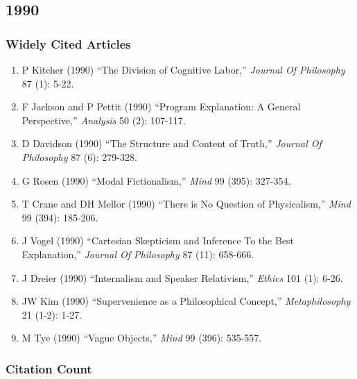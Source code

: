 \documentclass[
  10pt,
  letterpaper,
  DIV=11,
  numbers=noendperiod,
  twoside]{scrartcl}
\providecommand{\tightlist}{%
  \setlength{\itemsep}{0pt}\setlength{\parskip}{0pt}}\usepackage{longtable,booktabs,array}
\begin{document}
\newpage

\subsection{1990}\label{sec-s1990}

\subsubsection*{Widely Cited Articles}\label{widely-cited-articles-34}

\begin{enumerate}
\def\labelenumi{\arabic{enumi}.}
\tightlist
\item
  P Kitcher (1990) ``The Division of Cognitive Labor,'' \emph{Journal Of
  Philosophy} 87 (1): 5-22.
\item
  F Jackson and P Pettit (1990) ``Program Explanation: A General
  Perspective,'' \emph{Analysis} 50 (2): 107-117.
\item
  D Davidson (1990) ``The Structure and Content of Truth,''
  \emph{Journal Of Philosophy} 87 (6): 279-328.
\item
  G Rosen (1990) ``Modal Fictionalism,'' \emph{Mind} 99 (395): 327-354.
\item
  T Crane and DH Mellor (1990) ``There is No Question of Physicalism,''
  \emph{Mind} 99 (394): 185-206.
\item
  J Vogel (1990) ``Cartesian Skepticism and Inference To the Best
  Explanation,'' \emph{Journal Of Philosophy} 87 (11): 658-666.
\item
  J Dreier (1990) ``Internalism and Speaker Relativism,'' \emph{Ethics}
  101 (1): 6-26.
\item
  JW Kim (1990) ``Supervenience as a Philosophical Concept,''
  \emph{Metaphilosophy} 21 (1-2): 1-27.
\item
  M Tye (1990) ``Vague Objects,'' \emph{Mind} 99 (396): 535-557.
\end{enumerate}

\subsubsection*{Citation Count}\label{sec-count-1990}
\end{document}
